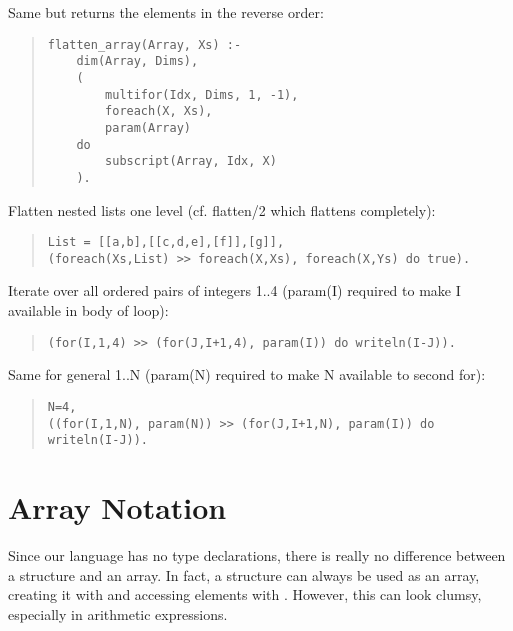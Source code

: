 Same but returns the elements in the reverse order:
\begin{quote}
\begin{verbatim}
flatten_array(Array, Xs) :-
    dim(Array, Dims),
    (
        multifor(Idx, Dims, 1, -1),
        foreach(X, Xs),
        param(Array)
    do
        subscript(Array, Idx, X)
    ).
\end{verbatim}
\end{quote}

Flatten nested lists one level (cf. flatten/2 which flattens completely):
\begin{quote}
\begin{verbatim}
List = [[a,b],[[c,d,e],[f]],[g]],
(foreach(Xs,List) >> foreach(X,Xs), foreach(X,Ys) do true).
\end{verbatim}
\end{quote}

Iterate over all ordered pairs of integers 1..4 (param(I) required to make
I available in body of loop):
\begin{quote}
\begin{verbatim}
(for(I,1,4) >> (for(J,I+1,4), param(I)) do writeln(I-J)).
\end{verbatim}
\end{quote}

Same for general 1..N (param(N) required to make N available to second for):
\begin{quote}
\begin{verbatim}
N=4,
((for(I,1,N), param(N)) >> (for(J,I+1,N), param(I)) do writeln(I-J)).
\end{verbatim}
\end{quote}


\section{Array Notation}

Since our language has no type declarations, there is really
no difference between a structure and an array. In fact,
a structure can always be used as an array, creating it with
and accessing elements with
.
However, this can look clumsy, especially in arithmetic expressions.


